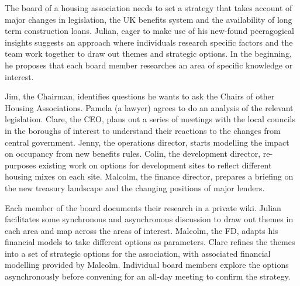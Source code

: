 The board of a housing association needs to set a strategy that takes
account of major changes in legislation, the UK benefits system and the
availability of long term construction loans. Julian, eager to make use
of his new-found peeragogical insights suggests an approach where
individuals research specific factors and the team work together to draw
out themes and strategic options. In the beginning, he proposes that
each board member researches an area of specific knowledge or interest.

Jim, the Chairman, identifies questions he wants to ask the Chairs of
other Housing Associations. Pamela (a lawyer) agrees to do an analysis
of the relevant legislation. Clare, the CEO, plans out a series of
meetings with the local councils in the boroughs of interest to
understand their reactions to the changes from central government.
Jenny, the operations director, starts modelling the impact on occupancy
from new benefits rules. Colin, the development director, re-purposes
existing work on options for development sites to reflect different
housing mixes on each site. Malcolm, the finance director, prepares a
briefing on the new treasury landscape and the changing positions of
major lenders.

Each member of the board documents their research in a private wiki.
Julian facilitates some synchronous and asynchronous discussion to draw
out themes in each area and map across the areas of interest. Malcolm,
the FD, adapts his financial models to take different options as
parameters. Clare refines the themes into a set of strategic options for
the association, with associated financial modelling provided by
Malcolm. Individual board members explore the options asynchronously
before convening for an all-day meeting to confirm the strategy.


